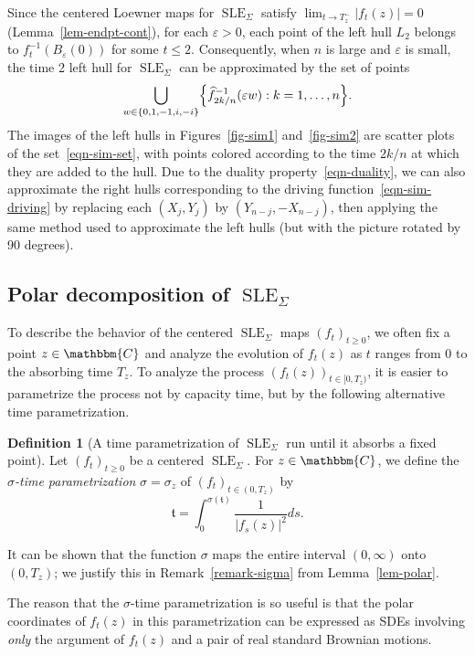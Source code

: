 \documentclass[11pt]{article}
\theoremstyle{plain}
\theoremstyle{definition}
\newtheorem{defn}[thm]{Definition}
\numberwithin{equation}{section}
\newcommand{\eqb}{\begin{equation}}
\newcommand{\eqe}{\end{equation}}
\newcommand{\BB}{\mathbbm}
\newcommand{\ep}{\varepsilon}
\newcommand{\rta}{\rightarrow}
\newcommand{\wh}{\widehat}
\newcommand{\SLEG}{{\operatorname{SLE}}_\Sigma}
\newcommand{\tz}{{\mathfrak t}}
\let\originalleft\left
\let\originalright\right
\renewcommand{\left}{\mathopen{}\mathclose\bgroup\originalleft}
\renewcommand{\right}{\aftergroup\egroup\originalright}
\begin{document}
Since the centered Loewner maps for $\SLEG$ satisfy $\lim_{t\rta T_z^-} |f_t(z)| = 0$ (Lemma~\ref{lem-endpt-cont}), for each $\ep  > 0$, each point of the left hull $L_2$ belongs to $f_t^{-1}(B_\ep(0))$ for some $t\leq 2$. Consequently, when $n$ is large and $\ep$ is small, the time 2 left hull for $\SLEG$ can be approximated by the set of points
\eqb \label{eqn-sim-set}
\bigcup_{w\in \{0,1,-1,i,-i\}} \left\{ \wh f_{2k/n}^{-1}( \ep w)  : k=1,\dots, n \right\} .
\eqe 
The images of the left hulls in Figures~\ref{fig-sim1} and~\ref{fig-sim2} are scatter plots of the set~\eqref{eqn-sim-set}, with points colored according to the time $2k/n$ at which they are added to the hull. Due to the duality property~\eqref{eqn-duality}, we can also approximate the right hulls corresponding to the driving function~\eqref{eqn-sim-driving} by replacing each $(X_j , Y_j)$ by $(Y_{n-j} , - X_{n-j})$, then applying the same method used to approximate the left hulls (but with the picture rotated by 90 degrees). 


\subsection{Polar decomposition of $\SLEG$}
\label{sec-polar}

To describe the behavior of the centered $\SLEG$ maps $(f_t)_{t \geq 0}$, we often fix a point $z \in \BB{C}$ and analyze the evolution of $f_t(z)$ as $t$ ranges from $0$ to the absorbing time $T_z$.  To analyze the process $(f_t(z))_{t\in [0,T_z)}$, it is easier to parametrize the process not by capacity time, but by the following alternative time parametrization.

\begin{defn}[A time parametrization of $\SLEG$ run until it absorbs a fixed point]
\label{defn-sigma}
Let $(f_t)_{t \geq 0}$ be a centered $\SLEG$.
For $z \in \BB{C}$, we define the \emph{$\sigma$-time parametrization} $\sigma = \sigma_z$ of $(f_t)_{t \in (0,T_z)}$
by
\eqb \label{eqn-defn-sigma}
\tz = \int_0^{\sigma(\tz)} \frac{1}{|f_s(z)|^2} ds.
\eqe
\end{defn}


It can be shown that the function $\sigma$ maps the entire interval $(0,\infty)$ onto $(0,T_z)$; we justify this in Remark~\ref{remark-sigma} from Lemma~\ref{lem-polar}. 

The reason that the $\sigma$-time parametrization is so useful is that the polar coordinates of $f_t(z)$ in this parametrization can be expressed as SDEs involving \emph{only} the argument of $f_t(z)$ and a pair of real standard Brownian motions.  
\end{document}

